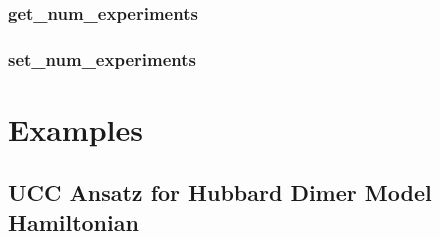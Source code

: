 \documentclass[10pt]{book}
\begin{document}
\subsubsection{\textbf{get\_num\_experiments}}\label{subsec:getnumexp}


\subsubsection{\textbf{set\_num\_experiments}}\label{subsec:setnumexp}


\clearpage


\section{\qcor Examples}\label{sec:examples}

\subsection{UCC Ansatz for Hubbard Dimer Model Hamiltonian}\label{subsec:hubbard_dimer_ex}


\clearpage



\end{document}
